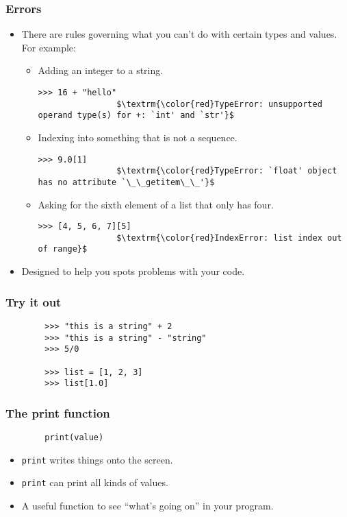 \documentclass[notes]{beamer}
\begin{document}
	\begin{frame}[fragile]
		\frametitle{Errors}
		
		\begin{itemize}
			\item There are rules governing what you can't do with certain types and values.
			\pause For example:
			\begin{itemize}
				\item Adding an integer to a string.
				\begin{lstlisting}[xleftmargin=\dimexpr-\leftmargini]
				>>> 16 + "hello"
				$\textrm{\color{red}TypeError: unsupported operand type(s) for +: `int' and `str'}$
				\end{lstlisting}
				
				\pause
				
				\item Indexing into something that is not a sequence.
				\begin{lstlisting}[xleftmargin=\dimexpr-\leftmargini]
				>>> 9.0[1]
				$\textrm{\color{red}TypeError: `float' object has no attribute `\_\_getitem\_\_'}$
				\end{lstlisting}
				
				\pause
				
				\item Asking for the sixth element of a list that only has four.
				\begin{lstlisting}[xleftmargin=\dimexpr-\leftmargini]
				>>> [4, 5, 6, 7][5]
				$\textrm{\color{red}IndexError: list index out of range}$
				\end{lstlisting}
				
				\pause
			\end{itemize}
			\item Designed to help you spots problems with your code.
		\end{itemize}
	\end{frame}
	
	\begin{frame}[fragile]
		\frametitle{Try it out}
		
		\begin{lstlisting}
		>>> "this is a string" + 2
		>>> "this is a string" - "string"
		>>> 5/0
		
		>>> list = [1, 2, 3]
		>>> list[1.0]
		\end{lstlisting}
	\end{frame}
	
	\begin{frame}[fragile]
		\frametitle{The print function}
		\begin{lstlisting}
		print(value)
		\end{lstlisting}
		\begin{itemize}
			\item \lstinline|print| writes things onto the screen.
			\pause
			\item \lstinline|print| can print all kinds of values.
			\pause
			\item A useful function to see ``what's going on'' in your program.
		\end{itemize}
	\end{frame}
	
\end{document}
